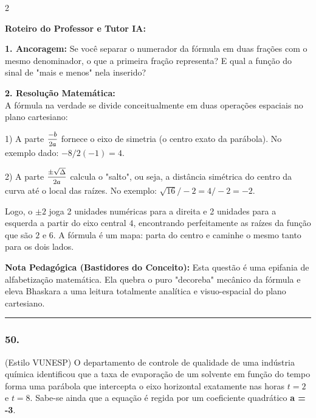 \begin{multicols*}{2}
\ifgabarito
    \begin{tcolorbox}[colback=CorTitUm!5, colframe=CorTitUm, boxrule=1pt, arc=4pt, left=6pt, right=6pt, top=6pt, bottom=6pt]
    \small\textbf{\textcolor{CorTitUm}{Roteiro do Professor e Tutor IA:}}\par\vspace{0.1cm}
    \color{CinzaEscuro}
    \textbf{1. Ancoragem:} Se você separar o numerador da fórmula em duas frações com o mesmo denominador, o que a primeira fração representa? E qual a função do sinal de "mais e menos" nela inserido?\par\vspace{0.1cm}
    \textbf{2. Resolução Matemática:}\\
    A fórmula na verdade se divide conceitualmente em duas operações espaciais no plano cartesiano:
    
    1) A parte $\mfrac{-b}{2a}$ fornece o eixo de simetria (o centro exato da parábola). No exemplo dado: $-8 / 2(-1) = 4$.
    
    2) A parte $\mfrac{\pm \sqrt{\Delta}}{2a}$ calcula o "salto", ou seja, a distância simétrica do centro da curva até o local das raízes. No exemplo: $\sqrt{16} / -2 = 4 / -2 = -2$. 
    
    Logo, o $\pm 2$ joga 2 unidades numéricas para a direita e 2 unidades para a esquerda a partir do eixo central $4$, encontrando perfeitamente as raízes da função que são $2$ e $6$. A fórmula é um mapa: parta do centro e caminhe o mesmo tanto para os dois lados.
    \end{tcolorbox}
    \vspace{0.15cm}
    
    \begin{boxexplicacao}
    \textbf{Nota Pedagógica (Bastidores do Conceito):} Esta questão é uma epifania de alfabetização matemática. Ela quebra o puro "decoreba" mecânico da fórmula e eleva Bhaskara a uma leitura totalmente analítica e visuo-espacial do plano cartesiano.
    \end{boxexplicacao}
\fi

\par\vspace{\espacoQuestao}

\noindent\textcolor{CorLinha}{\rule{\linewidth}{0.5pt}} 
\par\vspace{\espacoPreQuestao}
\subsubsection*{50.} 
\begin{enunciadoLiteral}
(Estilo VUNESP) O departamento de controle de qualidade de uma indústria química identificou que a taxa de evaporação de um solvente em função do tempo forma uma parábola que intercepta o eixo horizontal exatamente nas horas $t = 2$ e $t = 8$. Sabe-se ainda que a equação é regida por um coeficiente quadrático \textbf{a = -3}.


\end{enunciadoLiteral}
\end{multicols*}
